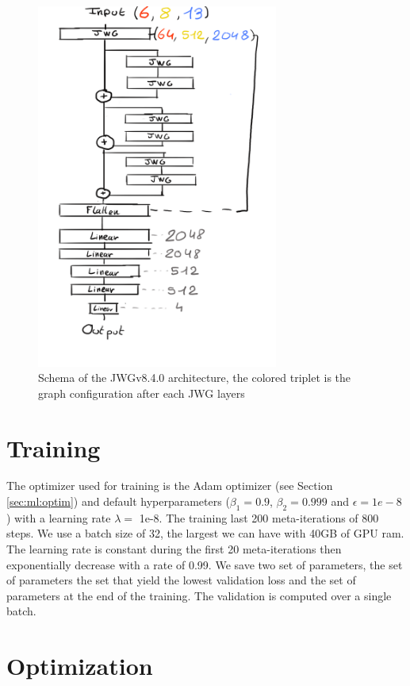 \documentclass[../main.tex]{subfiles}
\begin{document}
\begin{figure}
  \centering
  \includegraphics[height=12cm]{images/jgnn/jwgv8_4.png}
  \caption{Schema of the JWGv8.4.0 architecture, the colored triplet is the graph configuration after each JWG layers}
  \label{fig:jgnn:model-schematic}
\end{figure}


\section{Training}

The optimizer used for training is the Adam optimizer (see Section \ref{sec:ml:optim}) and default hyperparameters ($\beta_1= 0.9$, $\beta_2 = 0.999$ and $\epsilon = 1e-8$) with a learning rate $\lambda = $ 1e-8. The training last 200 meta-iterations of 800 steps. We use a batch size of 32, the largest we can have with 40GB of GPU ram. The learning rate is constant during the first 20 meta-iterations then exponentially decrease with a rate of 0.99. We save two set of parameters, the set of parameters the set that yield the lowest validation loss and the set of parameters at the end of the training. The validation is computed over a single batch.

\section{Optimization}
\end{document}
